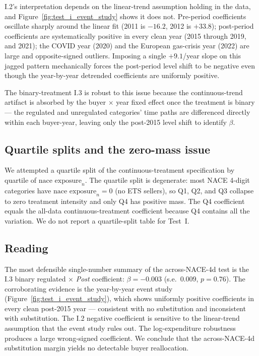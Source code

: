 I.2's interpretation depends on the linear-trend assumption holding in the data, and Figure~\ref{fig:test_i_event_study} shows it does not. Pre-period coefficients oscillate sharply around the linear fit (2011 is $-16.2$, 2012 is $+33.8$); post-period coefficients are systematically positive in every clean year (2015 through 2019, and 2021); the COVID year (2020) and the European gas-crisis year (2022) are large and opposite-signed outliers. Imposing a single $+9.1$/year slope on this jagged pattern mechanically forces the post-period level shift to be negative even though the year-by-year detrended coefficients are uniformly positive.

The binary-treatment I.3 is robust to this issue because the continuous-trend artifact is absorbed by the buyer $\times$ year fixed effect once the treatment is binary --- the regulated and unregulated categories' time paths are differenced directly within each buyer-year, leaving only the post-2015 level shift to identify $\beta$.

\subsection{Quartile splits and the zero-mass issue}

We attempted a quartile split of the continuous-treatment specification by quartile of $\text{nace exposure}_n$. The quartile split is degenerate: most NACE 4-digit categories have $\text{nace exposure}_n = 0$ (no ETS sellers), so Q1, Q2, and Q3 collapse to zero treatment intensity and only Q4 has positive mass. The Q4 coefficient equals the all-data continuous-treatment coefficient because Q4 contains all the variation. We do not report a quartile-split table for Test~I.

\subsection{Reading}

The most defensible single-number summary of the across-NACE-4d test is the I.3 binary regulated $\times$ \textit{Post} coefficient: $\beta = -0.003$ (s.e.\ $0.009$, $p = 0.76$). The corroborating evidence is the year-by-year event study (Figure~\ref{fig:test_i_event_study}), which shows uniformly positive coefficients in every clean post-2015 year --- consistent with no substitution and inconsistent with substitution. The I.2 negative coefficient is sensitive to the linear-trend assumption that the event study rules out. The log-expenditure robustness produces a large wrong-signed coefficient. We conclude that the across-NACE-4d substitution margin yields no detectable buyer reallocation.
